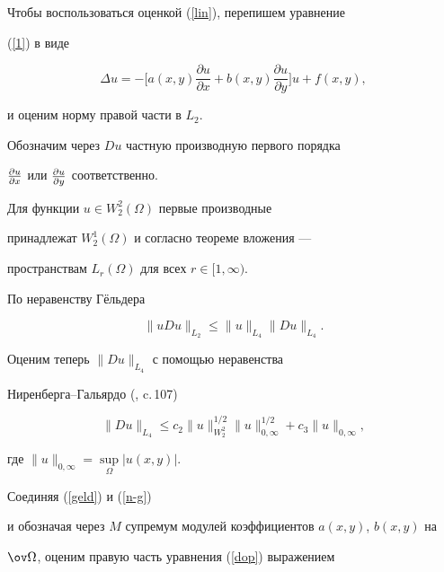 Чтобы воспользоваться оценкой (\ref{lin}), перепишем уравнение


(\ref{1}) в виде


\begin{equation}\label{dop}


\Delta u=-\bigg[a(x,y)\frac{\partial u}{\partial x}+b(x,y)\frac{\partial


u}{\partial y}\bigg]u+f(x,y),


\end{equation}


и оценим норму правой части в $L_2$.





Обозначим через $Du$ частную производную первого порядка


$\frac {\partial u} {\partial x}$ или $\frac {\partial u} {\partial y}$ соответственно.


Для функции $u\in W^2_2(\Omega)$ первые производные 


принадлежат $W^1_2(\Omega)$ и согласно теореме вложения ---


пространствам $L_r(\Omega)$ для всех $r\in [1,\infty)$.


По неравенству Г\"ельдера


\begin{equation}\label{geld}


\|uDu\|_{L_2}\le


\|u\|_{L_4}\|Du\|_{L_4}.


\end{equation}


Оценим теперь $\|Du\|_{L_4}$ с помощью неравенства


Ниренберга--Гальярдо (\cite{nir}, c.\,107)


\begin{equation}\label{n-g}


\|Du\|_{L_4}\le c_2\|u\|^{1/2}_{W^2_2} \|u\|^{1/2}_{0,\infty }+


c_3\|u\|_{0,\infty },


\end{equation}


где $\|u\|_{0,\infty }=\sup \limits_{\Omega }|u(x,y)|$.





Соединяя (\ref{geld}) и (\ref{n-g})


и обозначая через $M$ супремум модулей коэффициентов $a(x,y)$, $b(x,y)$ на


$\ov \Omega$, оценим правую часть уравнения (\ref{dop}) выражением


